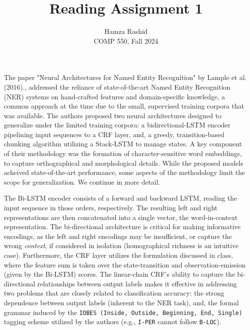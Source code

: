 \documentclass[11pt]{article}
\title{Reading Assignment 1}
\author{Hamza Rashid \\ COMP 550, Fall 2024}
\date{}
\begin{document}
\maketitle


The paper "Neural Architectures for 
Named Entity Recognition" by Lample et al. (2016)., 
addressed the reliance of state-of-the-art 
Named Entity Recognition (NER) systems on 
hand-crafted  features and domain-specific knowledge, 
a common approach at the time due to the small, 
supervised training corpora that was available. 
The authors proposed two neural 
architectures designed to generalize 
under the limited training corpora: a 
bidirectional-LSTM encoder pipelining input sequences
to a CRF layer, and, a greedy, transition-based 
chunking algorithm utilizing a Stack-LSTM to manage states. 
A key component of their methodology was
the formation of character-sensitive word 
embeddings, to capture orthographical and morphological 
details. While the proposed models acheived
state-of-the-art performance, some aspects
of the methodology limit the scope for generalization. 
We continue in more detail.


The Bi-LSTM encoder consists of a forward and backward 
LSTM, reading the input sequence in those orders, respectively.
The resulting left and right representations are then concatenated
into a single vector, the word-in-context representation.
The bi-directional architecture is critical 
for making informative encodings, 
as the left and right encodings 
may be insufficient, or capture the wrong \textit{context},
if considered in isolation
(homographical richness is an intuitive case). 
Furthermore, the CRF layer utilizes the formulation
discussed in class, where the feature sum is taken 
over the state-transition and observation-emission (given by the Bi-LSTM) scores.
The linear-chain CRF's ability to capture the bi-directional
relationships between output labels makes it effective in addressing 
two problems that are closely related to classification accuracy: 
the strong dependence between output labels (inherent to the NER task), 
and, the formal grammar induced by the \texttt{IOBES (Inside, Outside, Beginning, End, Single)}
tagging scheme utilized by the authors (e.g., \texttt{I-PER} cannot follow \texttt{B-LOC}).
\end{document}
